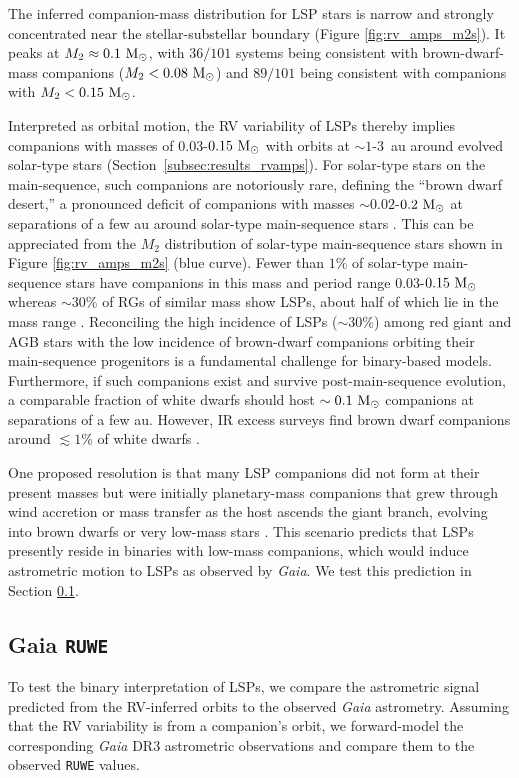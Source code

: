\documentclass[trackchanges,twocolumn]{aastex631}
\begin{document}
The inferred companion-mass distribution for LSP stars is narrow and strongly concentrated near the stellar-substellar boundary (Figure \ref{fig:rv_amps_m2s}). It peaks at $M_2 \approx 0.1~{\rm M_\odot}$, with $36/101$ systems being consistent with brown-dwarf-mass companions ($M_2 < 0.08~{\rm M_\odot}$) and $89/101$ being consistent with companions with $M_2 < 0.15~{\rm M_\odot}$. 

Interpreted as orbital motion, the RV variability of LSPs thereby implies companions with masses of $0.03$-$0.15~{\rm M_\odot}$ with orbits at $\sim1$-$3$~au around evolved solar-type stars (Section~\ref{subsec:results_rvamps}). 
For solar-type stars on the main-sequence, such companions are notoriously rare, defining the ``brown dwarf desert,'' a pronounced deficit of companions with masses $\sim0.02$-$0.2~{\rm M_\odot}$ at separations of a few au around solar-type main-sequence stars \citep[e.g.,][]{Marcy00,Grether06}. This can be appreciated from the $M_2$ distribution of solar-type main-sequence stars shown in Figure \ref{fig:rv_amps_m2s} (blue curve). 
Fewer than $1\%$ of solar-type main-sequence stars have companions in this mass and period range $0.03$-$0.15~{\rm M_\odot}$ whereas $\sim30\%$ of RGs of similar mass show LSPs, about half of which lie in the mass range \citep[][]{Soszynski21,Pawlak24}. Reconciling the high incidence of LSPs ($\sim30\%$) among red giant and AGB stars with the low incidence of brown-dwarf companions orbiting their main-sequence progenitors is a fundamental challenge for binary-based models. 
Furthermore, if such companions exist and survive post-main-sequence evolution, a comparable fraction of white dwarfs should host $\sim0.1~{\rm M_\odot}$ companions at separations of a few au. However, IR excess surveys find brown dwarf companions around $\lesssim1\%$ of white dwarfs \citep[e.g.,][]{Farihi05,Girven11,Steele11}.

One proposed resolution is that many LSP companions did not form at their present masses but were initially planetary-mass companions that grew through wind accretion or mass transfer as the host ascends the giant branch, evolving into brown dwarfs or very low-mass stars \citep[e.g.,][]{Retter05,Soszynski21}. This scenario predicts that LSPs presently reside in binaries with low-mass companions, which would induce astrometric motion to LSPs as observed by {\it Gaia}. We test this prediction in Section \ref{subsec:results_ruwe}.

\subsection{Gaia {\tt RUWE}}\label{subsec:results_ruwe}
To test the binary interpretation of LSPs, we compare the astrometric signal predicted from the RV-inferred orbits to the observed {\it Gaia} astrometry. Assuming that the RV variability is from a companion's orbit, we forward-model the corresponding {\it Gaia} DR3 astrometric observations and compare them to the observed {\tt RUWE} values.
\end{document}

